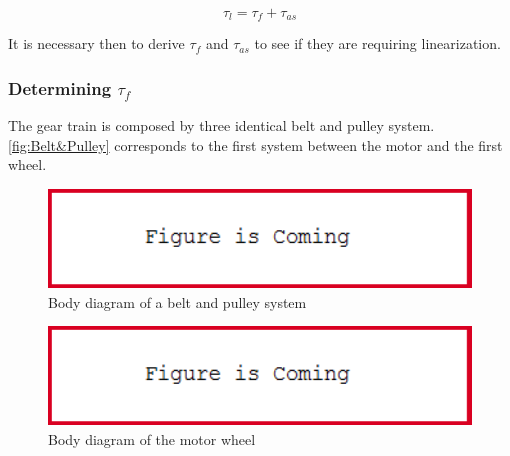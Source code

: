\begin{equation}\label{eq:TauL}
	\tau_l = \tau_f + \tau_{as}
\end{equation}

It is necessary then to derive $\tau_f$ and $\tau_{as}$ to see if they are requiring linearization.

\subsubsection*{Determining $\tau_{f}$}
The gear train is composed by three identical belt and pulley system. \autoref{fig:Belt&Pulley} corresponds to the first system between the motor and the first wheel. 
\begin{figure}[htbp]
    \centering
    \includegraphics[width=1\textwidth]{figures/FigureIsComing.PNG}
    \caption{Body diagram of a belt and pulley system}
    \label{fig:Belt&Pulley}
\end{figure}

\startexplain
{}
\stopexplain



\begin{figure}[htbp]
    \centering
    \includegraphics[width=1\textwidth]{figures/FigureIsComing.PNG}
    \caption{Body diagram of the motor wheel}
    \label{fig:BodyDiagramsMotorWheel}
\end{figure}

